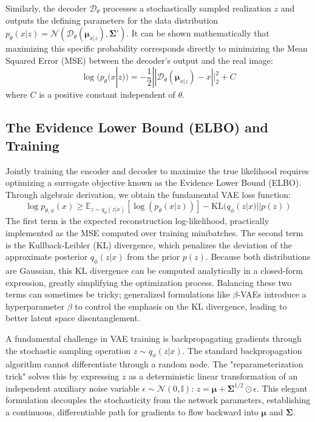 Similarly, the decoder $\mathcal{D}_\theta$ processes a stochastically sampled realization $z$ and outputs the defining parameters for the data distribution $p_\theta(x|z) = \mathcal{N}(\mathcal{D}_\theta(\boldsymbol{\mu}_{x|z}), \boldsymbol{\Sigma}')$. It can be shown mathematically that maximizing this specific probability corresponds directly to minimizing the Mean Squared Error (MSE) between the decoder's output and the real image:
\begin{equation}
\log(p_\theta(x|z)) = -\frac{1}{2} ||\mathcal{D}_\theta(\boldsymbol{\mu}_{x|z}) - x||_2^2 + C
\end{equation}
where $C$ is a positive constant independent of $\theta$.

\subsection{The Evidence Lower Bound (ELBO) and Training}
Jointly training the encoder and decoder to maximize the true likelihood requires optimizing a surrogate objective known as the Evidence Lower Bound (ELBO). Through algebraic derivation, we obtain the fundamental VAE loss function:
\begin{equation}
\log p_{\theta,\phi}(x) \ge \mathbb{E}_{z \sim q_\phi(z|x)} [\log(p_\theta(x|z))] - \text{KL}(q_\phi(z|x) || p(z))
\end{equation}
The first term is the expected reconstruction log-likelihood, practically implemented as the MSE computed over training minibatches. The second term is the Kullback-Leibler (KL) divergence, which penalizes the deviation of the approximate posterior $q_\phi(z|x)$ from the prior $p(z)$. Because both distributions are Gaussian, this KL divergence can be computed analytically in a closed-form expression, greatly simplifying the optimization process. Balancing these two terms can sometimes be tricky; generalized formulations like $\beta$-VAEs introduce a hyperparameter $\beta$ to control the emphasis on the KL divergence, leading to better latent space disentanglement.

\begin{insightbox}
A fundamental challenge in VAE training is backpropagating gradients through the stochastic sampling operation $z \sim q_\phi(z|x)$. The standard backpropagation algorithm cannot differentiate through a random node. The "reparameterization trick" solves this by expressing $z$ as a deterministic linear transformation of an independent auxiliary noise variable $\epsilon \sim \mathcal{N}(0, \mathbb{I})$:
$z = \boldsymbol{\mu} + \boldsymbol{\Sigma}^{1/2} \odot \epsilon$.
This elegant formulation decouples the stochasticity from the network parameters, establishing a continuous, differentiable path for gradients to flow backward into $\boldsymbol{\mu}$ and $\boldsymbol{\Sigma}$.
\end{insightbox}

